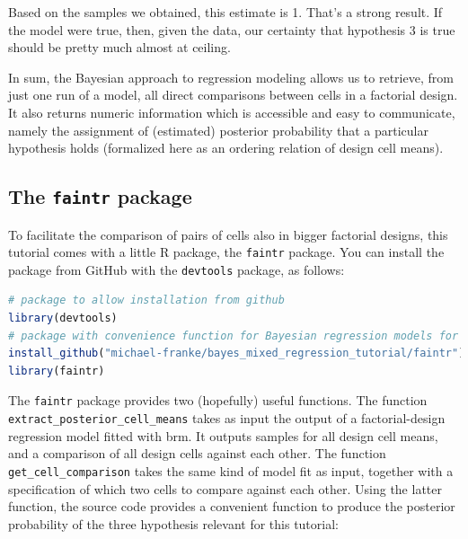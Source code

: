 \documentclass[nobib]{tufte-handout}
\begin{document}
Based on the samples we obtained, this estimate is 1. That's a strong result. If the model were true, then, given the data, our certainty that hypothesis 3 is true should be pretty much almost at ceiling.

In sum, the Bayesian approach to regression modeling allows us to retrieve, from just one run of a model, all direct comparisons between cells in a factorial design. It also returns numeric information which is accessible and easy to communicate, namely the assignment of (estimated)
posterior probability that a particular hypothesis holds (formalized here as an ordering relation of design cell means).

\subsection{The \texttt{faintr} package}

To facilitate the comparison of pairs of cells also in bigger factorial designs, this tutorial comes with a little R package, the \texttt{faintr} package.
%
%
You can install the package from GitHub with the \texttt{devtools} package, as follows:

\begin{minipage}[]{1\textwidth}
\begin{lstlisting}[language=R]
# package to allow installation from github
library(devtools)
# package with convenience function for Bayesian regression models for factorial designs
install_github("michael-franke/bayes_mixed_regression_tutorial/faintr") # install from GitHub
library(faintr)
\end{lstlisting}
\end{minipage}

The \texttt{faintr} package provides two (hopefully) useful functions. The function \texttt{extract\_posterior\_cell\_means} takes as input the output of a factorial-design regression model fitted with \textrm{brm}. It outputs samples for all design cell means, and a comparison of all design cells against each other. The function \texttt{get\_cell\_comparison} takes the same kind of model fit as input, together with a specification of which two cells to compare against each other. Using the latter function, the source code provides a convenient function to produce the posterior probability of the three hypothesis relevant for this tutorial:
%
\end{document}
